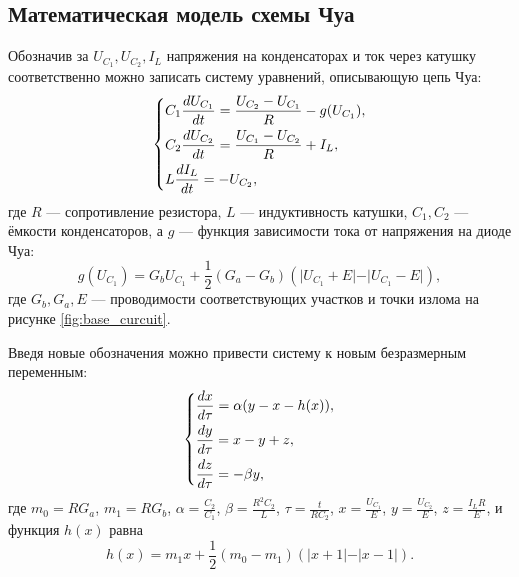 \documentclass[12pt]{article}
\begin{document}
\subsection*{Математическая модель схемы Чуа}
Обозначив за $U_{C_1}, U_{C_2}, I_{L}$ напряжения на конденсаторах и ток через катушку соответственно можно записать систему уравнений, описывающую цепь Чуа: 
\begin{equation}
	\begin{dcases}
		C_1 \frac{d U_{C_1}}{dt} = \frac{U_{C_2} - U_{C_1}}{R} - g(U_{C_1}), \\
		C_2 \frac{d U_{C_2}}{dt} = \frac{U_{C_1} - U_{C_2}}{R} + I_L, \\ 
		L \frac{d I_L}{dt} = -U_{C_2},
	\end{dcases}
	\label{eq:chua_system}
\end{equation} 
где $R$ --- сопротивление резистора, $L$ --- индуктивность катушки, $C_1, C_2$ --- ёмкости конденсаторов, а $g$ --- функция зависимости тока от напряжения 
на диоде Чуа: 
\[
	g(U_{C_1}) = G_b U_{C_1} + \frac{1}{2} \left( G_a - G_b \right) \left( \vert U_{C_1} + E \vert - \vert U_{C_1} - E \vert \right),
\]
где $G_b, G_a, E$ --- проводимости соответствующих участков и точки излома на рисунке \ref{fig:base_curcuit}.

Введя новые обозначения можно привести систему к новым безразмерным переменным: 
\begin{equation}
	\begin{dcases}
		\frac{dx}{d \tau} = \alpha(y - x - h(x)), \\
		\frac{dy}{d \tau} = x - y + z, \\
		\frac{dz}{d \tau} = -\beta y, \\
	\end{dcases}
	\label{eq:chua_system_}
\end{equation}
где $m_0 = R G_a$, $m_1 = R G_b$, $\alpha = \frac{C_2}{C_1}$, $\beta = \frac{R^2 C_2}{L}$, 
$\tau = \frac{t}{R C_2}$, $x = \frac{U_{C_1}}{E}$, $y = \frac{U_{C_2}}{E}$, $z = \frac{I_L R}{E}$, и функция $h(x)$ равна 
\[
	h(x) = m_1 x + \frac{1}{2}(m_0 - m_1)(\vert x + 1 \vert - \vert x - 1 \vert ).
\]
\end{document}
